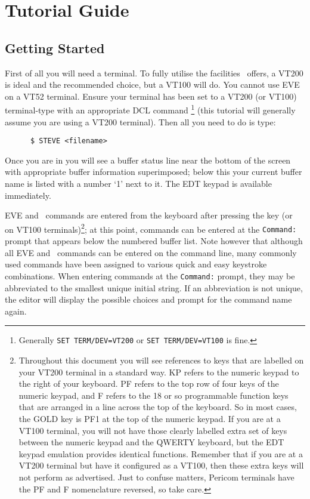 \section{Tutorial Guide}
\label{tutorial_guide}

\subsection{Getting Started}

First of all you will need a terminal. To fully utilise the facilities \STEve\
offers, a VT200 is ideal and the recommended choice, but a VT100 will do. You
cannot use EVE on a VT52 terminal. Ensure your terminal has been set to a VT200
(or VT100) terminal-type with an appropriate DCL command \footnote{ Generally
{\tt SET TERM/DEV=VT200} or {\tt SET TERM/DEV=VT100} is fine.} (this tutorial
will generally assume you are using a VT200 terminal). Then all you need
to do is type:

\begin{verbatim}
      $ STEVE <filename>
\end{verbatim}

Once you are in you will see a buffer status line near the bottom of the screen
with appropriate buffer information superimposed; below this  your current
buffer name is listed with a number `1' next to it. The EDT keypad is available
immediately.

EVE and \STEve\ commands are entered from the keyboard after pressing the
\keyname{Do} key (or \gold\ \keyname{KP7} on VT100 terminals)\footnote{
Throughout this document you will see references to keys that are labelled on
your VT200 terminal in a standard way. KP refers to the numeric keypad to the
right of your keyboard. PF refers to the top row of four keys of the numeric
keypad, and F refers to the 18 or so programmable function keys that are
arranged in a line across the top of the keyboard. So in most cases, the GOLD
key is PF1 at the top of the numeric keypad. If you are at a VT100 terminal,
you will not have those clearly labelled extra set of keys between the numeric
keypad and the QWERTY keyboard, but the EDT keypad emulation provides identical
functions. Remember that if you are at a VT200 terminal but have it configured
as a VT100, then these extra keys will not perform as advertised. Just to
confuse matters, Pericom terminals have the PF and F nomenclature reversed, so
take care.}; 
at this point, commands can be entered at the {\tt Command:} prompt that
appears below the numbered buffer list. Note however that although all EVE and
\STEve\ commands can be entered on the command line, many commonly used
commands have been assigned to various quick and easy keystroke combinations.
When entering commands at the {\tt Command:} prompt, they may be abbreviated 
to the smallest unique initial string. If an abbreviation is not unique, the
editor will display the possible choices and prompt for the command name again.

